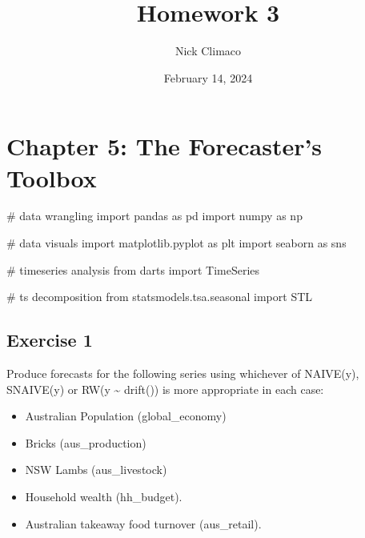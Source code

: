 \documentclass[
  11pt,
]{article}
\title{Homework 3}
\author{Nick Climaco}
\date{February 14, 2024}
\newenvironment{Shaded}{\begin{snugshade}}{\end{snugshade}}
\newcommand{\CommentTok}[1]{\textcolor[rgb]{0.37,0.37,0.37}{#1}}
\newcommand{\ImportTok}[1]{\textcolor[rgb]{0.00,0.46,0.62}{#1}}
\newcommand{\NormalTok}[1]{\textcolor[rgb]{0.00,0.23,0.31}{#1}}
\renewcommand*\contentsname{Table of contents}
\newcommand\contentsname{Table of contents}
\begin{document}
\maketitle


\renewcommand*\contentsname{Table of contents}
{
\hypersetup{linkcolor=}
\setcounter{tocdepth}{3}
\tableofcontents
}
\newpage

\section{Chapter 5: The Forecaster's
Toolbox}\label{chapter-5-the-forecasters-toolbox}

\begin{Shaded}
\begin{Highlighting}[]
\CommentTok{\# data wrangling }
\ImportTok{import}\NormalTok{ pandas }\ImportTok{as}\NormalTok{ pd }
\ImportTok{import}\NormalTok{ numpy }\ImportTok{as}\NormalTok{ np}

\CommentTok{\# data visuals}
\ImportTok{import}\NormalTok{ matplotlib.pyplot }\ImportTok{as}\NormalTok{ plt }
\ImportTok{import}\NormalTok{ seaborn }\ImportTok{as}\NormalTok{ sns}

\CommentTok{\# timeseries analysis}
\ImportTok{from}\NormalTok{ darts }\ImportTok{import}\NormalTok{ TimeSeries}

\CommentTok{\# ts decomposition}
\ImportTok{from}\NormalTok{ statsmodels.tsa.seasonal }\ImportTok{import}\NormalTok{ STL}
\end{Highlighting}
\end{Shaded}

\subsection{Exercise 1}\label{exercise-1}

Produce forecasts for the following series using whichever of NAIVE(y),
SNAIVE(y) or RW(y \textasciitilde{} drift()) is more appropriate in each
case:

\begin{itemize}
\item
  Australian Population (global\_economy)
\item
  Bricks (aus\_production)
\item
  NSW Lambs (aus\_livestock)
\item
  Household wealth (hh\_budget).
\item
  Australian takeaway food turnover (aus\_retail).
\end{itemize}
\end{document}
